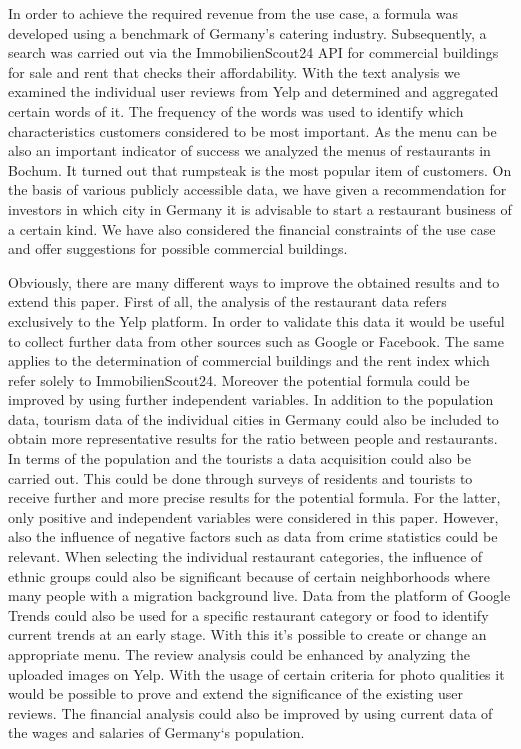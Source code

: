 In order to achieve the required revenue from the use case, a formula was developed using a benchmark of Germany's catering industry. Subsequently, a search was carried out via the ImmobilienScout24 \ac{API} for commercial buildings for sale and rent that checks their affordability.
With the text analysis we examined the individual user reviews from Yelp and determined and aggregated certain words of it. The frequency of the words was used to identify which characteristics customers considered to be most important.
As the menu can be also an important indicator of success we analyzed the menus of restaurants in Bochum. It turned out that rumpsteak is the most popular item of customers. \newline
On the basis of various publicly accessible data, we have given a recommendation for investors in which city in Germany it is advisable to start a restaurant business of a certain kind. We have also considered the financial constraints of the use case and offer suggestions for possible commercial buildings.\newline

Obviously, there are many different ways to improve the obtained results and to extend this paper. First of all, the analysis of the restaurant data refers exclusively to the Yelp platform. In order to validate this data it would be useful to collect further data from other sources such as Google or Facebook. The same applies to the determination of commercial buildings and the rent index which refer solely to ImmobilienScout24. \newline
Moreover the potential formula could be improved by using further independent variables. In addition to the population data, tourism data of the individual cities in Germany could also be included to obtain more representative results for the ratio between people and restaurants. In terms of the population and the tourists a data acquisition could also be carried out. This could be done through surveys of residents and tourists to receive further and more precise results for the potential formula. For the latter, only positive and independent variables were considered in this paper. However, also the influence of negative factors such as data from crime statistics could be relevant. \newline
When selecting the individual restaurant categories, the influence of ethnic groups could also be significant because of certain neighborhoods where many people with a migration background live. Data from the platform of Google Trends could also be used for a specific restaurant category or food to identify current trends at an early stage. With this it's possible to create or change an appropriate menu. \newline
The review analysis could be enhanced by analyzing the uploaded images on Yelp. With the usage of certain criteria for photo qualities it would be possible to prove and extend the significance of the existing user reviews. The financial analysis could also be improved by using current data of the wages and salaries of Germany‘s population.